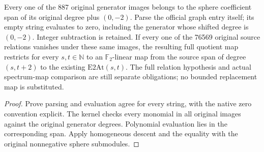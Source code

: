 \begin{proposition}
  \label{prop:lin-native-ceta-map-grading}
  \leanok
  Every one of the 887 original generator images belongs to the sphere
  coefficient span of its original degree plus $(0,-2)$. Parse the official
  graph entry itself; its empty string evaluates to zero, including the
  generator whose shifted degree is $(0,-2)$. Integer subtraction is retained.
  If every one of the 76569 original source relations vanishes under these
  same images, the resulting full quotient map restricts for every
  $s,t\in\mathbb N$ to an $\mathbb F_2$-linear map from the source span
  of degree $(s,t+2)$ to the existing $\mathrm{E2At}(s,t)$.
  The full relation hypothesis and actual spectrum-map comparison are still
  separate obligations; no bounded replacement map is substituted.
\end{proposition}
\begin{proof}
  \leanok
  Prove parsing and evaluation agree for every string, with the native zero
  convention explicit. The kernel checks every monomial in all original
  images against the original generator degrees. Polynomial evaluation lies
  in the corresponding span. Apply homogeneous descent and the equality
  with the original nonnegative sphere submodules.
\end{proof}

